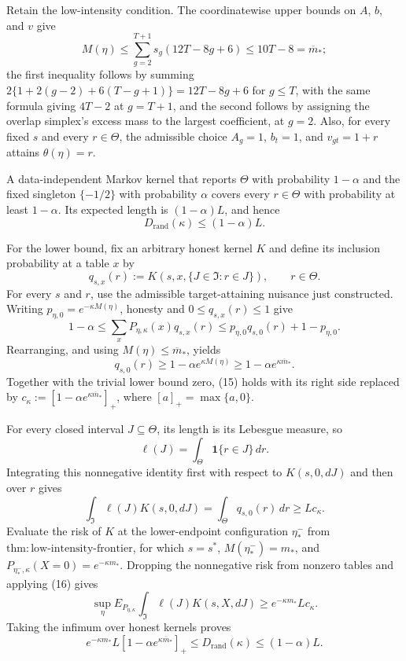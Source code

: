 Retain the low-intensity condition.  The coordinatewise upper bounds on \(A\), \(b\), and \(v\) give
\[
 M(\eta)\le\sum_{g=2}^{T+1}s_g(12T-8g+6)
 \le10T-8=\overline m_*;
\tag{13}
\]
the first inequality follows by summing \(2\{1+2(g-2)+6(T-g+1)\}=12T-8g+6\) for \(g\le T\), with the same formula giving \(4T-2\) at \(g=T+1\), and the second follows by assigning the overlap simplex's excess mass to the largest coefficient, at \(g=2\).  Also, for every fixed \(s\) and every \(r\in\Theta\), the admissible choice \(A_g=1\), \(b_t=1\), and \(v_{gt}=1+r\) attains \(\theta(\eta)=r\).

A data-independent Markov kernel that reports \(\Theta\) with probability \(1-\alpha\) and the fixed singleton \(\{-1/2\}\) with probability \(\alpha\) covers every \(r\in\Theta\) with probability at least \(1-\alpha\).  Its expected length is \((1-\alpha)L\), and hence
\[
 D_{\mathrm{rand}}(\kappa)\le(1-\alpha)L.
\tag{14}
\]

For the lower bound, fix an arbitrary honest kernel \(K\) and define its inclusion probability at a table \(x\) by
\[
 q_{s,x}(r):=K(s,x,\{J\in\mathfrak I:r\in J\}),
 \qquad r\in\Theta.
\]
For every \(s\) and \(r\), use the admissible target-attaining nuisance just constructed.  Writing \(p_{\eta,0}=e^{-\kappa M(\eta)}\), honesty and \(0\le q_{s,x}(r)\le1\) give
\[
 1-\alpha
 \le \sum_xP_{\eta,\kappa}(x)q_{s,x}(r)
 \le p_{\eta,0}q_{s,0}(r)+1-p_{\eta,0}.
\]
Rearranging, and using \(M(\eta)\le\overline m_*\), yields
\[
 q_{s,0}(r)\ge1-\alpha e^{\kappa M(\eta)}
 \ge1-\alpha e^{\kappa\overline m_*}.
\tag{15}
\]
Together with the trivial lower bound zero, (15) holds with its right side replaced by
\(c_\kappa:=[1-\alpha e^{\kappa\overline m_*}]_+\), where \([a]_+=\max\{a,0\}\).

For every closed interval \(J\subseteq\Theta\), its length is its Lebesgue measure, so
\[
 \ell(J)=\int_\Theta \mathbf 1\{r\in J\}\,dr.
\]
Integrating this nonnegative identity first with respect to \(K(s,0,dJ)\) and then over \(r\) gives
\[
 \int_{\mathfrak I}\ell(J)K(s,0,dJ)
 =\int_\Theta q_{s,0}(r)\,dr
 \ge Lc_\kappa.
\tag{16}
\]
Evaluate the risk of \(K\) at the lower-endpoint configuration \(\eta_*^-\) from \(\mathrm{thm{:}low\text{-}intensity\text{-}frontier}\), for which \(s=s^*\), \(M(\eta_*^-)=m_*\), and \(P_{\eta_*^-,\kappa}(X=0)=e^{-\kappa m_*}\).  Dropping the nonnegative risk from nonzero tables and applying (16) gives
\[
 \sup_\eta E_{P_{\eta,\kappa}}
       \int_{\mathfrak I}\ell(J)K(s,X,dJ)
 \ge e^{-\kappa m_*}Lc_\kappa.
\]
Taking the infimum over honest kernels proves
\[
 e^{-\kappa m_*}L[1-\alpha e^{\kappa\overline m_*}]_+
 \le D_{\mathrm{rand}}(\kappa)\le(1-\alpha)L.
\tag{17}
\]

